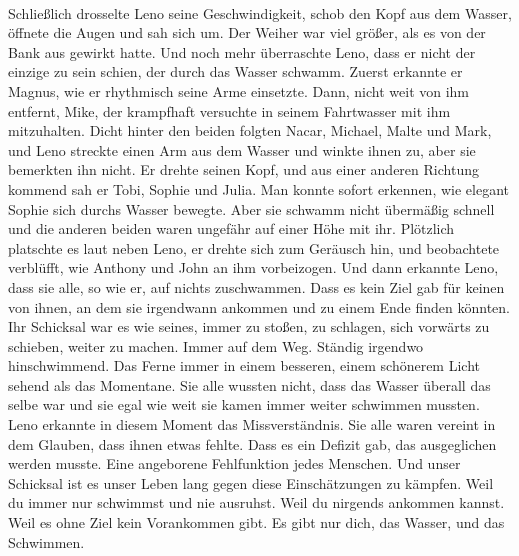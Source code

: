 \documentclass[ngerman,smalldemyvopaper,11pt,oneside,onecolumn,openright,extrafontsizes]{memoir}
\begin{document}
\vspace{0.5em} \\
Schließlich drosselte Leno seine Geschwindigkeit, schob den Kopf aus dem Wasser, öffnete die Augen und sah sich um. Der Weiher war viel größer, als es von der Bank aus gewirkt hatte. Und noch mehr überraschte Leno, dass er nicht der einzige zu sein schien, der durch das Wasser schwamm. Zuerst erkannte er Magnus, wie er rhythmisch seine Arme einsetzte. Dann, nicht weit von ihm entfernt, Mike, der krampfhaft versuchte in seinem Fahrtwasser mit ihm mitzuhalten. Dicht hinter den beiden folgten Nacar, Michael, Malte und Mark, und Leno streckte einen Arm aus dem Wasser und winkte ihnen zu, aber sie bemerkten ihn nicht. Er drehte seinen Kopf, und aus einer anderen Richtung kommend sah er Tobi, Sophie und Julia. Man konnte sofort erkennen, wie elegant Sophie sich durchs Wasser bewegte. Aber sie schwamm nicht übermäßig schnell und die anderen beiden waren ungefähr auf einer Höhe mit ihr. Plötzlich platschte es laut neben Leno, er drehte sich zum Geräusch hin, und beobachtete verblüfft, wie Anthony und John an ihm vorbeizogen. Und dann erkannte Leno, dass sie alle, so wie er, auf nichts zuschwammen. Dass es kein Ziel gab für keinen von ihnen, an dem sie irgendwann ankommen und zu einem Ende finden könnten. Ihr Schicksal war es wie seines, immer zu stoßen, zu schlagen, sich vorwärts zu schieben, weiter zu machen. Immer auf dem Weg. Ständig irgendwo hinschwimmend. Das Ferne immer in einem besseren, einem schönerem Licht sehend als das Momentane. Sie alle wussten nicht, dass das Wasser überall das selbe war und sie egal wie weit sie kamen immer weiter schwimmen mussten. Leno erkannte in diesem Moment das Missverständnis. Sie alle waren vereint in dem Glauben, dass ihnen etwas fehlte. Dass es ein Defizit gab, das ausgeglichen werden musste. Eine angeborene Fehlfunktion jedes Menschen. Und unser Schicksal ist es unser Leben lang gegen diese Einschätzungen zu kämpfen. Weil du immer nur schwimmst und nie ausruhst. Weil du nirgends ankommen kannst. Weil es ohne Ziel kein Vorankommen gibt. Es gibt nur dich, das Wasser, und das Schwimmen.\\
\end{document}
